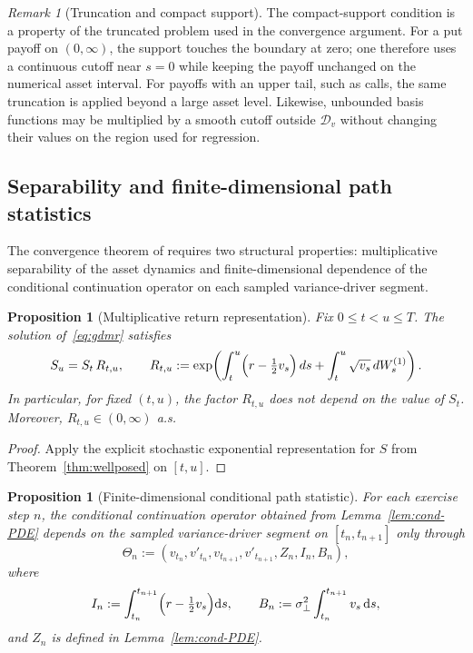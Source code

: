 \documentclass[10pt]{article}
\theoremstyle{plain}
\newtheorem{proposition}[theorem]{Proposition}
\theoremstyle{definition}
\theoremstyle{remark}
\newtheorem{remark}[theorem]{Remark}
\newcommand{\dd}{\mathrm d}
\begin{document}
\begin{remark}[Truncation and compact support]\label{rem:truncation-compact-support}
The compact-support condition is a property of the truncated problem used in the convergence argument. For a put
payoff on $(0,\infty)$, the support touches the boundary at zero; one therefore uses a continuous cutoff near
$s=0$ while keeping the payoff unchanged on the numerical asset interval. For payoffs with an upper tail, such as
calls, the same truncation is applied beyond a large asset level. Likewise, unbounded basis functions may be
multiplied by a smooth cutoff outside $\mathcal D_v$ without changing their values on the region used for
regression.
\end{remark}

\subsection{Separability and finite-dimensional path statistics}
\label{subsec:separability}

The convergence theorem of \cite{farahany2020mixing} requires two structural properties: multiplicative
separability of the asset dynamics and finite-dimensional dependence of the conditional continuation operator on
each sampled variance-driver segment.

\begin{proposition}[Multiplicative return representation]
\label{prop:multiplicative_return}
Fix $0\le t<u\le T$. The solution of~\eqref{eq:gdmr} satisfies
\[
S_u = S_t\,R_{t,u},
\qquad
R_{t,u} := \exp\!\left(\int_t^u\Bigl(r-\tfrac12 v_s\Bigr)\,ds + \int_t^u \sqrt{v_s}\,dW^{(1)}_s\right).
\]
In particular, for fixed $(t,u)$, the factor $R_{t,u}$ does not depend on the value of $S_t$.
Moreover, $R_{t,u}\in(0,\infty)$ a.s.
\end{proposition}

\begin{proof}
Apply the explicit stochastic exponential representation for $S$ from Theorem~\ref{thm:wellposed} on $[t,u]$.
\end{proof}

\begin{proposition}[Finite-dimensional conditional path statistic]
\label{prop:finite_path_statistic}
For each exercise step $n$, the conditional continuation operator obtained from Lemma~\ref{lem:cond-PDE}
depends on the sampled variance-driver segment on $[t_n,t_{n+1}]$ only through
\[
\Theta_n
:=\left(v_{t_n},v'_{t_n},v_{t_{n+1}},v'_{t_{n+1}},Z_n,I_n,B_n\right),
\]
where
\[
I_n:=\int_{t_n}^{t_{n+1}}\Bigl(r-\tfrac12v_s\Bigr)\dd s,\qquad
B_n:=\sigma_\perp^2\int_{t_n}^{t_{n+1}}v_s\,\dd s,
\]
and $Z_n$ is defined in Lemma~\ref{lem:cond-PDE}.
\end{proposition}
\end{document}
